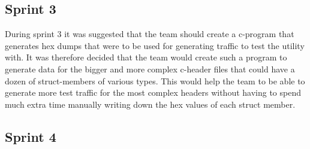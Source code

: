 \subsection{Sprint 3}
During sprint 3 it was suggested that the team should create a \Gls{c}-program that generates \glspl{hex dump} that were to be used for generating traffic to test the \gls{utility} with. It was therefore decided that the team would create such a program to generate data for the bigger and more complex \Gls{c}-\gls{header} files that could have a dozen of \gls{struct}-\glspl{member} of various types. This would help the team to be able to generate more test traffic for the most complex \glspl{header} without having to spend much extra time manually writing down the hex values of each \gls{struct} \gls{member}.

\subsection{Sprint 4}

